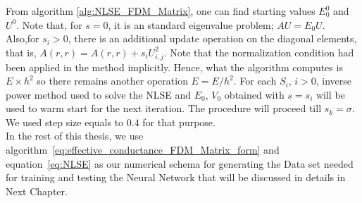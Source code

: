 From algorithm \eqref{alg:NLSE_FDM_Matrix}, one can find starting values $E_0^0$ and $U^0$. Note that, for $s = 0$, it is an standard eigenvalue problem; $AU = E_0U$. Also,for $s_i > 0$, there is an additional update operation on the diagonal elements, that is, $A(r,r) = A(r,r) + s_i U_{i,j}^2$. Note that the normalization condition had been applied in the method implicitly. Hence, what the algorithm computes is $E\times h^2$ so there remains another operation $E = E/h^2$. For each $S_i$, $i>0$, inverse power method used to solve the NLSE and $E_0$, $V_0$ obtained with $s=s_i$ will be used to warm start for the next iteration. The procedure will proceed till $s_k = \sigma$. We used step size equals to $0.4$ for that purpose.\\
In the rest of this thesis, we use algorithm~\eqref{eq:effective_conductance_FDM_Matrix_form} and equation~\eqref{eq:NLSE} as our numerical schema for generating the Data set needed for training and testing the Neural Network that will be discussed in details in Next Chapter.
